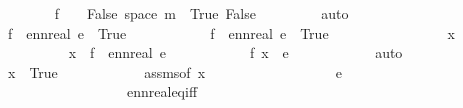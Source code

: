 \begin{isabellebody}
\ \ \ \ \ \ \isamarkupfalse%
\ {\isacartoucheopen}f\ {\isacharminus}{\kern0pt}{\isacharbackquote}{\kern0pt}\ {\isacharbraceleft}{\kern0pt}{}{\isacharbraceright}{\kern0pt}\ {\isacharequal}{\kern0pt}\ {\isacharbraceleft}{\kern0pt}False{\isacharbraceright}{\kern0pt}{\isacartoucheclose}\ {\isacartoucheopen}space\ m\ {\isacharequal}{\kern0pt}\ {\isacharbraceleft}{\kern0pt}True{\isacharcomma}{\kern0pt}\ False{\isacharbraceright}{\kern0pt}{\isacartoucheclose}\ \isanewline
\ \ \ \ \ \ \isamarkupfalse%
\ auto\ \isanewline
\ \ \ \ \isamarkupfalse%
\ {\isachardoublequoteopen}f\ {\isacharminus}{\kern0pt}{\isacharbackquote}{\kern0pt}\ {\isacharbraceleft}{\kern0pt}ennreal\ e{\isacharbraceright}{\kern0pt}\ {\isacharequal}{\kern0pt}\ {\isacharbraceleft}{\kern0pt}True{\isacharbraceright}{\kern0pt}{\isachardoublequoteclose}\isanewline
\ \ \ \ \isamarkupfalse%
\isanewline
\ \ \ \ \ \ \isamarkupfalse%
{\isachardoublequoteopen}f\ {\isacharminus}{\kern0pt}{\isacharbackquote}{\kern0pt}\ {\isacharbraceleft}{\kern0pt}ennreal\ e{\isacharbraceright}{\kern0pt}\ {\isasymsubseteq}\ {\isacharbraceleft}{\kern0pt}True{\isacharbraceright}{\kern0pt}{\isachardoublequoteclose}\isanewline
\ \ \ \ \ \ \isamarkupfalse%
\isanewline
\ \ \ \ \ \ \ \ \isamarkupfalse%
\ x\ \isanewline
\ \ \ \ \ \ \ \ \isamarkupfalse%
\ {\isachardoublequoteopen}x\ {\isasymin}\ f\ {\isacharminus}{\kern0pt}{\isacharbackquote}{\kern0pt}\ {\isacharbraceleft}{\kern0pt}ennreal\ e{\isacharbraceright}{\kern0pt}{\isachardoublequoteclose}\isanewline
\ \ \ \ \ \ \ \ \isamarkupfalse%
\ \isamarkupfalse%
\ {\isachardoublequoteopen}f\ x\ {\isacharequal}{\kern0pt}\ e{\isachardoublequoteclose}\isanewline
\ \ \ \ \ \ \ \ \ \ \isamarkupfalse%
\ auto\isanewline
\ \ \ \ \ \ \ \ \isamarkupfalse%
\ \isamarkupfalse%
\ {\isachardoublequoteopen}x\ {\isacharequal}{\kern0pt}\ True{\isachardoublequoteclose}\isanewline
\ \ \ \ \ \ \ \ \ \ \isamarkupfalse%
\ assms{\isacharparenleft}{\kern0pt}{}{\isacharparenright}{\kern0pt}{\isacharbrackleft}{\kern0pt}of\ x{\isacharbrackright}{\kern0pt}\ \isanewline
\ \ \ \ \ \ \ \ \ \ \ \ \ \ \ \ \ {\isacartoucheopen}e\ {\isachargreater}{\kern0pt}\ {}{\isacartoucheclose}\isanewline
\ \ \ \ \ \ \ \ \ \ \ \ \ \ \ \ \ \ ennreal{\isacharunderscore}{\kern0pt}eq{\isacharunderscore}{\kern0pt}{}{\isacharunderscore}{\kern0pt}iff\isanewline

\end{isabellebody}
